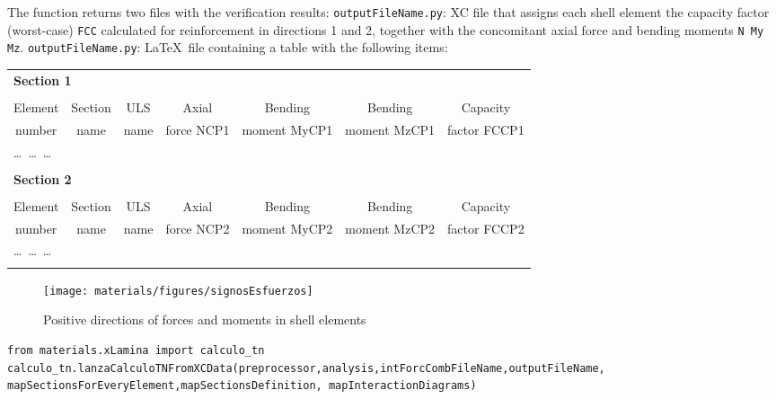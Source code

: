 The function returns two files with the verification results:
{\tt outputFileName.py}: XC file that assigns each shell element the capacity factor (worst-case) {\tt FCC} calculated for reinforcement in directions 1 and 2, together with the concomitant axial force and bending moments {\tt N My Mz}.
{\tt outputFileName.py}: \LaTeX\  file containing a table with the following items:

\begin{center}
\begin{tabular}{ccccccc}
\multicolumn{7}{l}{\textbf{Section 1}} \\
\\
Element & Section & ULS & Axial & Bending & Bending & Capacity \\
number  & name & name & force NCP1 & moment MyCP1 & moment MzCP1 & factor FCCP1 \\
\hline
\multicolumn{7}{l}{\ldots\ \ldots\ \ldots} \\
\\
\multicolumn{7}{l}{\textbf{Section 2}} \\
\\
Element & Section & ULS & Axial & Bending & Bending & Capacity \\
number  & name & name & force NCP2 & moment MyCP2 & moment MzCP2 & factor FCCP2 \\
\hline
\multicolumn{7}{l}{\ldots\ \ldots\ \ldots} \\
\\

\end{tabular}
\end{center}

\begin{figure}[h]
\centering
\texttt{[image: materials/figures/signosEsfuerzos]}
\caption{Positive directions of forces and moments in shell elements}\label{shell_forces_moments}
\end{figure}

 
\begin{verbatim}
from materials.xLamina import calculo_tn
calculo_tn.lanzaCalculoTNFromXCData(preprocessor,analysis,intForcCombFileName,outputFileName, 
mapSectionsForEveryElement,mapSectionsDefinition, mapInteractionDiagrams)
\end{verbatim}
\begin{paramFuncTable}
\preprocessor{} \\
\analysis{} \\
\\
\outputFileName{}\\
\mapSectionsForEveryElement{} \\
\mapSectionsDefinition{} \\
\mapInteractionDiagrams{} \\
\end{paramFuncTable}


